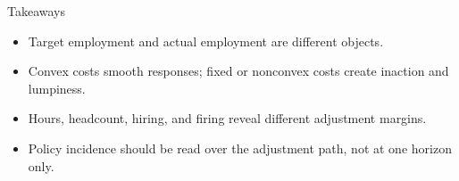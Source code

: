 \documentclass[aspectratio=169,11pt]{beamer}
\begin{document}
\begin{frame}{Takeaways}
\begin{itemize}
    \item Target employment and actual employment are different objects.
    \item Convex costs smooth responses; fixed or nonconvex costs create inaction and lumpiness.
    \item Hours, headcount, hiring, and firing reveal different adjustment margins.
    \item Policy incidence should be read over the adjustment path, not at one horizon only.
\end{itemize}
\end{frame}
\end{document}
